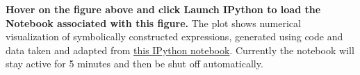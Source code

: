 \textbf{\label{fig:2}} \textbf{Hover on the figure above and click Launch IPython to load the Notebook associated with this figure.} The plot shows numerical visualization of symbolically constructed expressions, generated using code and data taken and adapted from \href{http://nbviewer.ipython.org/static/img/example-nb/sympy.png}{this IPython notebook}.  Currently the notebook will stay active for 5 minutes and then be shut off automatically.